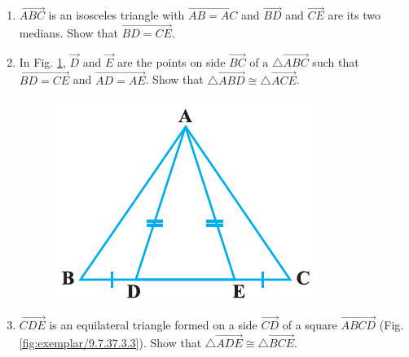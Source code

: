 \begin{enumerate}[label=\thesection.\arabic*,ref=\thesection.\theenumi]
	\item $\vec{ABC}$ is an isosceles triangle with $\vec{AB=AC}$ and $\vec{BD}$ and $\vec{CE}$ are its two medians. Show that $\vec{BD=CE}$.
	\item In Fig. \ref{fig:exemplar/9.7.37.3.2}, $\vec{D}$ and $\vec{E}$ are the points on side $\vec{BC}$ of a $\triangle \vec{ABC}$ such that $\vec{BD=CE}$ and $\vec{AD=AE}$. Show that $\triangle \vec{ABD} \cong \triangle \vec{ACE}$.
\begin{figure}[h]
	\centering
	\includegraphics[width=\columnwidth]{exemplar/9.7.3/figs/Figure1.png}
	\caption{}
	\label{fig:exemplar/9.7.37.3.2}
\end{figure}
\item $\vec{CDE}$ is an equilateral triangle formed on a side $\vec{CD}$ of a square $\vec{ABCD}$ (Fig. \ref{fig:exemplar/9.7.37.3.3}). Show that $\triangle \vec{ADE} \cong \triangle \vec{BCE}$.
\begin{figure}[h]
	\centering

\end{figure}
\end{enumerate}
